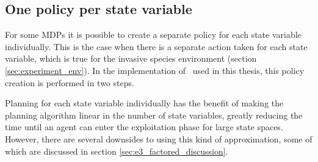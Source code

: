 \subsection{One policy per state variable}
\label{sec:one_policy_per_state_variable}

For some MDPs it is possible to create a separate policy for each state
variable individually. This is the case when there is a separate action taken
for each state variable, which is true for the invasive species environment
(section \ref{sec:experiment_env}). In the implementation of \etre\ used in
this thesis, this policy creation is performed in two steps. 

Planning for each state variable individually has the benefit of making the planning algorithm linear in the number of state variables, greatly reducing the time until an agent can enter the exploitation phase for large state spaces. However, there are several downsides to using this kind of approximation, some of which are discussed in section \ref{sec:e3_factored_discussion}.
